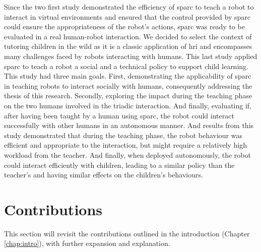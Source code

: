 Since the two first study demonstrated the efficiency of \gls{sparc} to teach a robot to interact in virtual environments and ensured that the control provided by \gls{sparc} could ensure the appropriateness of the robot's actions, \gls{sparc} was ready to be evaluated in a real human-robot interaction. We decided to select the context of tutoring children in the wild as it is a classic application of \gls{hri} and encompasses many challenges faced by robots interacting with humans. This last study applied \gls{sparc} to teach a robot a social and a technical policy to support child learning. This study had three main goals. First, demonstrating the applicability of \gls{sparc} in teaching robots to interact socially with humans, consequently addressing the thesis of this research. Secondly, exploring the impact during the teaching phase on the two humans involved in the triadic interaction. And finally, evaluating if, after having been taught by a human using \gls{sparc}, the robot could interact successfully with other humans in an autonomous manner. And results from this study demonstrated that during the teaching phase, the robot behaviour was efficient and appropriate to the interaction, but might require a relatively high workload from the teacher. And finally, when deployed autonomously, the robot could interact efficiently with children, leading to a similar policy than the teacher's and having similar effects on the children's behaviours.

\section{Contributions}\label{sec:conc_contribution}
This section will revisit the contributions outlined in the introduction (Chapter \ref{chap:intro}), with further expansion and explanation. 

